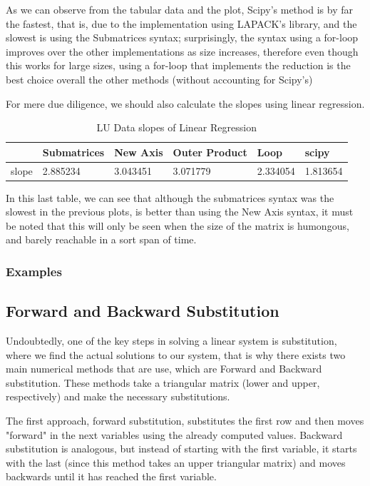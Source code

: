 As we can observe from the tabular data and the plot, Scipy's method is by far the fastest, that is, due to the implementation using LAPACK's library, and the slowest is using the Submatrices syntax; surprisingly, the syntax using a for-loop improves over the other implementations as size increases, therefore even though this works for large sizes, using a for-loop that implements the reduction is the best choice overall the other methods (without accounting for Scipy's) 

For mere due diligence, we should also calculate the slopes using  linear regression.
\begin{table}[H]
    \centering
    \begin{tabular}{|l|l|l|l|l|l|}
    \hline
        \textbf{} & \textbf{Submatrices} & \textbf{New Axis} & \textbf{Outer Product} & \textbf{Loop} & \textbf{scipy} \\ \hline
        slope & 2.885234 & 3.043451 & 3.071779 & 2.334054 & 1.813654 \\ \hline
    \end{tabular}
    \caption{LU Data slopes of Linear Regression}
\end{table}
In this last table, we can see that although the submatrices syntax was the slowest in the previous plots, is better than using the New Axis syntax, it must be noted that this will only be seen when the size of the matrix is humongous, and barely reachable in a sort span of time. 

\subsubsection{Examples}
	


\subsection{Forward and Backward Substitution}
Undoubtedly, one of the key steps in solving a linear system is substitution, where we find the actual solutions to our system, that is why there exists two main numerical methods that are use, which are Forward and Backward substitution. These methods take a triangular matrix (lower and upper, respectively) and make the necessary substitutions.

The first approach, forward substitution, substitutes the first row and then moves "forward" in the next variables using the already computed values. Backward substitution is analogous, but instead of starting with the first variable, it starts with the last (since this method takes an upper triangular matrix) and moves backwards until it has reached the first variable.

